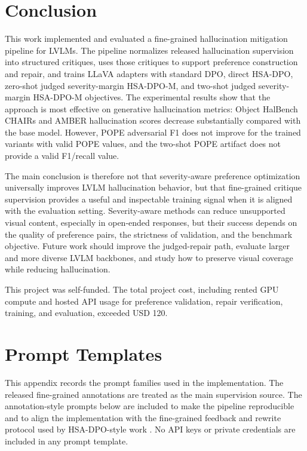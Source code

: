 \documentclass{article}
\begin{document}
\section{Conclusion}

This work implemented and evaluated a fine-grained hallucination mitigation pipeline for LVLMs. The pipeline normalizes released hallucination supervision into structured critiques, uses those critiques to support preference construction and repair, and trains LLaVA adapters with standard DPO, direct HSA-DPO, zero-shot judged severity-margin HSA-DPO-M, and two-shot judged severity-margin HSA-DPO-M objectives. The experimental results show that the approach is most effective on generative hallucination metrics: Object HalBench CHAIRs and AMBER hallucination scores decrease substantially compared with the base model. However, POPE adversarial F1 does not improve for the trained variants with valid POPE values, and the two-shot POPE artifact does not provide a valid F1/recall value.

The main conclusion is therefore not that severity-aware preference optimization universally improves LVLM hallucination behavior, but that fine-grained critique supervision provides a useful and inspectable training signal when it is aligned with the evaluation setting. Severity-aware methods can reduce unsupported visual content, especially in open-ended responses, but their success depends on the quality of preference pairs, the strictness of validation, and the benchmark objective. Future work should improve the judged-repair path, evaluate larger and more diverse LVLM backbones, and study how to preserve visual coverage while reducing hallucination.

\begin{ack}
This project was self-funded. The total project cost, including rented GPU compute and hosted API usage for preference validation, repair verification, training, and evaluation, exceeded USD 120.
\end{ack}




\appendix

\section{Prompt Templates}
\label{app:prompts}

This appendix records the prompt families used in the implementation. The released fine-grained annotations are treated as the main supervision source. The annotation-style prompts below are included to make the pipeline reproducible and to align the implementation with the fine-grained feedback and rewrite protocol used by HSA-DPO-style work \citep{xiao2025hsa}. No API keys or private credentials are included in any prompt template.
\end{document}
